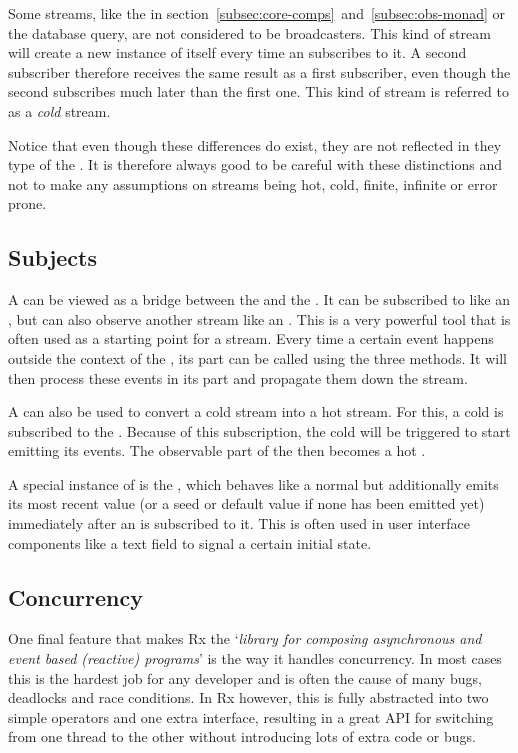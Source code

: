 Some streams, like the  in section~\ref{subsec:core-comps}~and~\ref{subsec:obs-monad} or the database query, are not considered to be broadcasters. This kind of stream will create a new instance of itself every time an \obv subscribes to it. A second subscriber therefore receives the same result as a first subscriber, even though the second subscribes much later than the first one. This kind of stream is referred to as a \textit{cold} stream.


Notice that even though these differences do exist, they are not reflected in they type of the \obs. It is therefore always good to be careful with these distinctions and not to make any assumptions on streams being hot, cold, finite, infinite or error prone.

\subsection{Subjects}
\label{subsec:subjects}
A \subj can be viewed as a bridge between the \obv and the \obs. It can be subscribed to like an \obs, but can also observe another stream like an \obv. This is a very powerful tool that is often used as a starting point for a stream. Every time a certain event happens outside the context of the \subj, its \obv part can be called using the three methods. It will then process these events in its \obs part and propagate them down the stream.

A \subj can also be used to convert a cold stream into a hot stream. For this, a cold \obs is subscribed to the \subj. Because of this subscription, the cold \obs will be triggered to start emitting its events. The observable part of the \subj then becomes a hot \obs.

A special instance of \subj is the \bsubj, which behaves like a normal \subj but additionally emits its most recent value (or a seed or default value if none has been emitted yet) immediately after an \obv is subscribed to it. This is often used in user interface components like a text field to signal a certain initial state.

\subsection{Concurrency}
One final feature that makes Rx the `\textit{library for composing asynchronous and event based (reactive) programs}' is the way it handles concurrency. In most cases this is the hardest job for any developer and is often the cause of many bugs, deadlocks and race conditions. In Rx however, this is fully abstracted into two simple operators and one extra interface, resulting in a great API for switching from one thread to the other without introducing lots of extra code or bugs.

